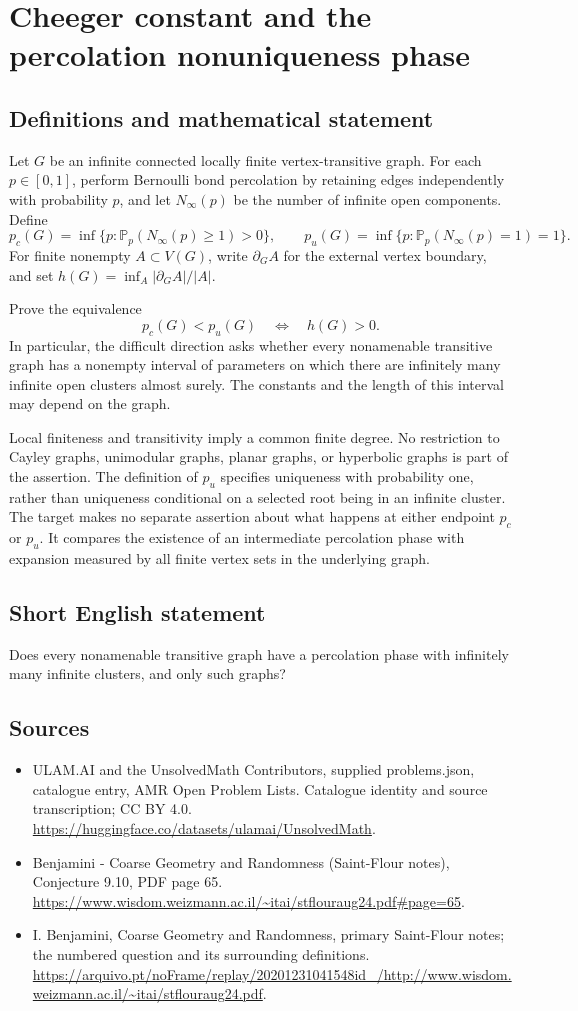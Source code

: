 \documentclass[11pt,a4paper]{article}
\begin{document}
\section*{Cheeger constant and the percolation nonuniqueness phase}\label{statement}

\subsection{Definitions and mathematical statement}
Let $G$ be an infinite connected locally finite vertex-transitive graph. For each $p\in[0,1]$, perform Bernoulli bond percolation by retaining edges independently with probability $p$, and let $N_\infty(p)$ be the number of infinite open components. Define
\[
p_c(G)=\inf\{p:\mathbb P_p(N_\infty(p)\ge1)>0\},
\qquad
p_u(G)=\inf\{p:\mathbb P_p(N_\infty(p)=1)=1\}.
\]
For finite nonempty $A\subset V(G)$, write $\partial_G A$ for the external vertex boundary, and set $h(G)=\inf_A|\partial_G A|/|A|$.

Prove the equivalence
\[
p_c(G)<p_u(G)\quad\Longleftrightarrow\quad h(G)>0.
\]
In particular, the difficult direction asks whether every nonamenable transitive graph has a nonempty interval of parameters on which there are infinitely many infinite open clusters almost surely. The constants and the length of this interval may depend on the graph.

Local finiteness and transitivity imply a common finite degree. No restriction to Cayley graphs, unimodular graphs, planar graphs, or hyperbolic graphs is part of the assertion. The definition of $p_u$ specifies uniqueness with probability one, rather than uniqueness conditional on a selected root being in an infinite cluster. The target makes no separate assertion about what happens at either endpoint $p_c$ or $p_u$. It compares the existence of an intermediate percolation phase with expansion measured by all finite vertex sets in the underlying graph.
\subsection{Short English statement}
Does every nonamenable transitive graph have a percolation phase with infinitely many infinite clusters, and only such graphs?
\subsection{Sources}
\begin{itemize}
\item[S1] ULAM.AI and the UnsolvedMath Contributors, supplied problems.json, catalogue entry, AMR Open Problem Lists. Catalogue identity and source transcription; CC BY 4.0.
\url{https://huggingface.co/datasets/ulamai/UnsolvedMath}.
\item[S2] Benjamini - Coarse Geometry and Randomness (Saint-Flour notes), Conjecture 9.10, PDF page 65. 
\url{https://www.wisdom.weizmann.ac.il/~itai/stflouraug24.pdf#page=65}.
\item[S3] I. Benjamini, Coarse Geometry and Randomness, primary Saint-Flour notes; the numbered question and its surrounding definitions.
\url{https://arquivo.pt/noFrame/replay/20201231041548id_/http://www.wisdom.weizmann.ac.il/~itai/stflouraug24.pdf}.
\end{itemize}
\end{document}
